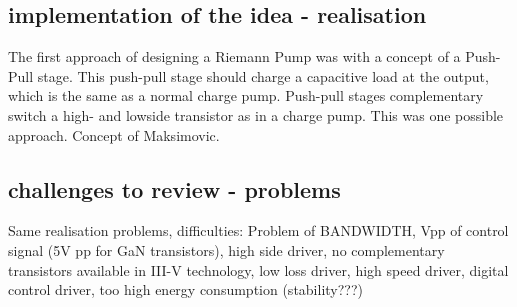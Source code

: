 \subsection{implementation of the idea - realisation}
The first approach of designing a Riemann Pump was with a concept of a Push-Pull stage. This push-pull stage should charge a capacitive load at the output, which is the same as a normal charge pump. Push-pull stages complementary switch a high- and lowside transistor as in a charge pump. This was one possible approach. Concept of Maksimovic. 
\subsection{challenges to review - problems}
Same realisation problems, difficulties: Problem of BANDWIDTH, Vpp of control signal (5V pp for GaN transistors), high side driver, no complementary transistors available in III-V technology, low loss driver, high speed driver, digital control driver, too high energy consumption (stability???)